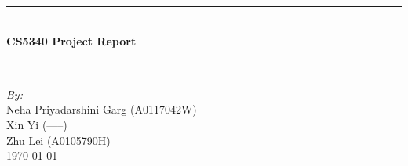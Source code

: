 \documentclass{article}
\begin{document}
\begin{titlepage}

\newcommand{\HRule}{\rule{\linewidth}{0.5mm}} %

\center %
 



\HRule \\[0.4cm]
{ \huge \bfseries CS5340 Project Report}\\[0.4cm] %
\HRule \\[1.5cm]




\Large \emph{By:}\\
Neha Priyadarshini Garg (A0117042W)\\ %
Xin Yi (-----)\\
Zhu Lei (A0105790H)\\[3cm]


{\large \today}\\[2cm] %

\vfill %

\end{titlepage}
\end{document}
